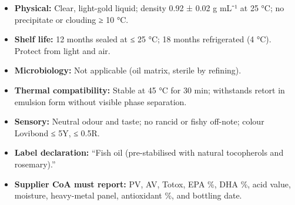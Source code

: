 \begin{itemize}
  \item \textbf{Physical:} Clear, light-gold liquid; density 0.92 ± 0.02 g mL⁻¹ at 25 °C; no precipitate or clouding ≥ 10 °C.

  \item \textbf{Shelf life:} 12 months sealed at ≤ 25 °C; 18 months refrigerated (4 °C). Protect from light and air.

  \item \textbf{Microbiology:} Not applicable (oil matrix, sterile by refining).

  \item \textbf{Thermal compatibility:} Stable at 45 °C for 30 min; withstands retort in emulsion form without visible phase separation.

  \item \textbf{Sensory:} Neutral odour and taste; no rancid or fishy off-note; colour Lovibond ≤ 5Y, ≤ 0.5R.

  \item \textbf{Label declaration:} “Fish oil (pre-stabilised with natural tocopherols and rosemary).”

  \item \textbf{Supplier CoA must report:}
        PV, AV, Totox, EPA \%, DHA \%, acid value, moisture, heavy-metal panel, antioxidant \%, and bottling date.
\end{itemize}
